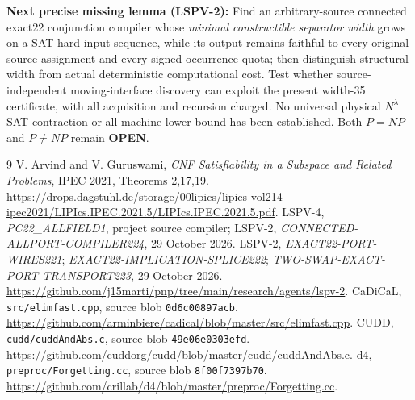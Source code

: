 \documentclass[10pt]{article}
\begin{document}
\noindent\textbf{Next precise missing lemma (LSPV-2):} Find an arbitrary-source connected exact22 conjunction compiler whose \emph{minimal constructible separator width} grows on a SAT-hard input sequence, while its output remains faithful to every original source assignment and every signed occurrence quota; then distinguish structural width from actual deterministic computational cost. Test whether source-independent moving-interface discovery can exploit the present width-35 certificate, with all acquisition and recursion charged. No universal physical $N^\lambda$ SAT contraction or all-machine lower bound has been established. Both $P=NP$ and $P\ne NP$ remain \textbf{OPEN}.

\begin{thebibliography}{9} V. Arvind and V. Guruswami, \emph{CNF Satisfiability in a Subspace and Related Problems}, IPEC 2021, Theorems 2,17,19. \url{https://drops.dagstuhl.de/storage/00lipics/lipics-vol214-ipec2021/LIPIcs.IPEC.2021.5/LIPIcs.IPEC.2021.5.pdf}.
 LSPV-4, \emph{PC22\_ALLFIELD1}, project source compiler; LSPV-2, \emph{CONNECTED-ALLPORT-COMPILER224}, 29 October 2026.
 LSPV-2, \emph{EXACT22-PORT-WIRES221}; \emph{EXACT22-IMPLICATION-SPLICE222}; \emph{TWO-SWAP-EXACT-PORT-TRANSPORT223}, 29 October 2026. \url{https://github.com/j15marti/pnp/tree/main/research/agents/lspv-2}.
 CaDiCaL, \texttt{src/elimfast.cpp}, source blob \texttt{0d6c00897acb}. \url{https://github.com/arminbiere/cadical/blob/master/src/elimfast.cpp}.
 CUDD, \texttt{cudd/cuddAndAbs.c}, source blob \texttt{49e06e0303efd}. \url{https://github.com/cuddorg/cudd/blob/master/cudd/cuddAndAbs.c}.
 d4, \texttt{preproc/Forgetting.cc}, source blob \texttt{8f00f7397b70}. \url{https://github.com/crillab/d4/blob/master/preproc/Forgetting.cc}.
\end{thebibliography}
\end{document}

